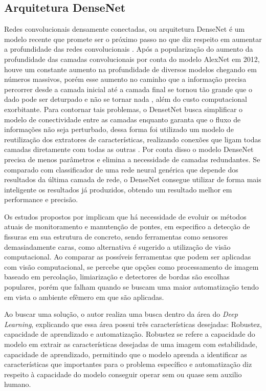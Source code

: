 \subsection{Arquitetura DenseNet}

Redes convolucionais densamente conectadas, ou arquitetura DenseNet \cite{huang2017densely} é um modelo recente que promete ser o próximo passo no que diz respeito em aumentar a profundidade das redes convolucionais \cite{PabloDenseNet2018}. 
Após a popularização do aumento da profundidade das camadas convolucionais por conta do modelo AlexNet \cite{krizhevsky2017imagenet} em 2012, houve um constante aumento na profundidade de diversos modelos chegando em números massivos, porém esse aumento no caminho que a informação precisa percorrer desde a camada inicial até a camada final se tornou tão grande que o dado pode ser deturpado e não se tornar nada \cite{PabloDenseNet2018}, além do custo computacional exorbitante. 
Para contornar tais problemas, o DensetNet busca simplificar o modelo de conectividade entre as camadas enquanto garanta que o fluxo de informações não seja perturbado, dessa forma foi utilizado um modelo de reutilização dos extratores de características, realizando conexões que ligam todas camadas diretamente com todas as outras \cite{huang2017densely}. Por conta disso o modelo DenseNet precisa de menos parâmetros e elimina a necessidade de camadas redundantes. Se comparado com classificador de uma rede neural genérica que depende dos resultados da última camada de rede, o DenseNet consegue utilizar de forma mais inteligente os resultados já produzidos, obtendo um resultado melhor em performance e precisão.

Os estudos propostos por  implicam que há necessidade de evoluir os métodos atuais de monitoramento e manutenção de pontes, em especifico a detecção de fissuras em sua estrutura de concreto, sendo ferramentas como sensores demasiadamente caras, como alternativa é sugerido a utilização de visão computacional. 
Ao comparar as possíveis ferramentas que podem ser aplicadas com visão computacional, se percebe que opções como processamento de imagem baseado em percolação, limiarização e detectores de bordas são escolhas populares, porém que falham quando se buscam uma maior automatização tendo em vista o ambiente efêmero em que são aplicadas.

Ao buscar uma solução, o autor realiza uma busca dentro da área do \textit{Deep Learning}, explicando que essa área possui três características desejadas: Robustez, capacidade de aprendizado e automatização. 
Robustez se refere a capacidade do modelo em extrair as características desejadas de uma imagem com estabilidade, capacidade de aprendizado, permitindo que o modelo aprenda a identificar as características que importantes para o problema específico e automatização diz respeito à capacidade do modelo conseguir operar sem ou quase sem auxilio humano.

